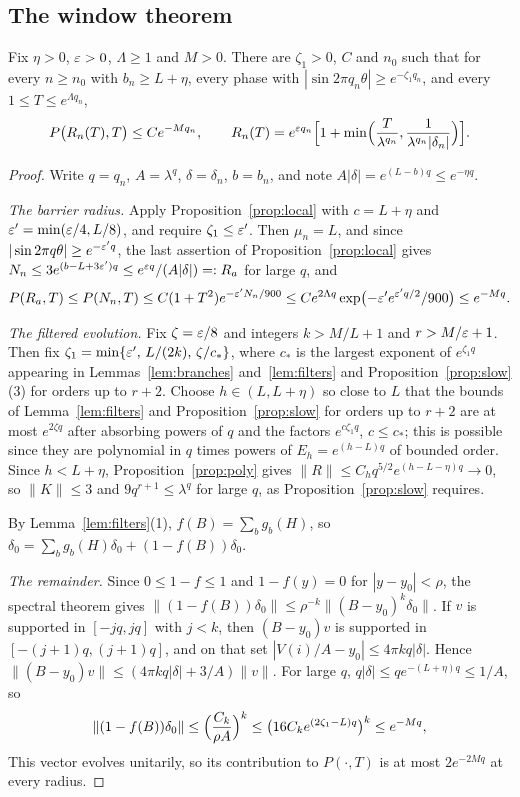 \subsection{The window theorem}

\begin{theorem}\label{thm:window}
Fix $\eta>0$, $\varepsilon>0$, $\Lambda\ge1$ and $M>0$. There are $\zeta_1>0$, $C$ and $n_0$ such that for every $n\ge n_0$ with $b_n\ge L+\eta$, every phase with $|\sin2\pi q_n\theta|\ge e^{-\zeta_1q_n}$, and every $1\le T\le e^{\Lambda q_n}$,
\[
P\bigl(R_n(T),T\bigr)\le Ce^{-Mq_n},\qquad R_n(T)=e^{\varepsilon q_n}\Bigl[1+\min\Bigl(\frac{T}{\lambda^{q_n}},\frac{1}{\lambda^{q_n}|\delta_n|}\Bigr)\Bigr].
\]
\end{theorem}

\begin{proof}
Write $q=q_n$, $A=\lambda^q$, $\delta=\delta_n$, $b=b_n$, and note $A|\delta|=e^{(L-b)q}\le e^{-\eta q}$.

\emph{The barrier radius.} Apply Proposition~\ref{prop:local} with $c=L+\eta$ and $\varepsilon'=\min(\varepsilon/4,L/8)$, and require $\zeta_1\le\varepsilon'$. Then $\mu_n=L$, and since $|\sin2\pi q\theta|\ge e^{-\varepsilon'q}$, the last assertion of Proposition~\ref{prop:local} gives $N_n\le3e^{(b-L+3\varepsilon')q}\le e^{\varepsilon q}/(A|\delta|)=:R_a$ for large $q$, and
\[
P(R_a,T)\le P(N_n,T)\le C(1+T^2)e^{-\varepsilon'N_n/900}\le Ce^{2\Lambda q}\exp\bigl(-\varepsilon'e^{\varepsilon'q/2}/900\bigr)\le e^{-Mq}.
\]

\emph{The filtered evolution.} Fix $\zeta=\varepsilon/8$ and integers $k>M/L+1$ and $r>M/\varepsilon+1$. Then fix $\zeta_1=\min\{\varepsilon',\,L/(2k),\,\zeta/c_*\}$, where $c_*$ is the largest exponent of $e^{\zeta_1q}$ appearing in Lemmas~\ref{lem:branches} and~\ref{lem:filters} and Proposition~\ref{prop:slow}(3) for orders up to $r+2$. Choose $h\in(L,L+\eta)$ so close to $L$ that the bounds of Lemma~\ref{lem:filters} and Proposition~\ref{prop:slow} for orders up to $r+2$ are at most $e^{2\zeta q}$ after absorbing powers of $q$ and the factors $e^{c\zeta_1q}$, $c\le c_*$; this is possible since they are polynomial in $q$ times powers of $E_h=e^{(h-L)q}$ of bounded order. Since $h<L+\eta$, Proposition~\ref{prop:poly} gives $\|R\|\le C_hq^{5/2}e^{(h-L-\eta)q}\to0$, so $\|K\|\le3$ and $9q^{r+1}\le\lambda^q$ for large $q$, as Proposition~\ref{prop:slow} requires.

By Lemma~\ref{lem:filters}(1), $f(B)=\sum_bg_b(H)$, so $\delta_0=\sum_bg_b(H)\delta_0+(1-f(B))\delta_0$.

\emph{The remainder.} Since $0\le1-f\le1$ and $1-f(y)=0$ for $|y-y_0|<\rho$, the spectral theorem gives $\|(1-f(B))\delta_0\|\le\rho^{-k}\|(B-y_0)^k\delta_0\|$. If $v$ is supported in $[-jq,jq]$ with $j<k$, then $(B-y_0)v$ is supported in $[-(j+1)q,(j+1)q]$, and on that set $|V(i)/A-y_0|\le4\pi kq|\delta|$. Hence $\|(B-y_0)v\|\le(4\pi kq|\delta|+3/A)\|v\|$. For large $q$, $q|\delta|\le qe^{-(L+\eta)q}\le1/A$, so
\[
\|(1-f(B))\delta_0\|\le\Bigl(\frac{C_k}{\rho A}\Bigr)^k\le\bigl(16C_ke^{(2\zeta_1-L)q}\bigr)^k\le e^{-Mq},
\]
This vector evolves unitarily, so its contribution to $P(\cdot,T)$ is at most $2e^{-2Mq}$ at every radius.


\end{proof}
